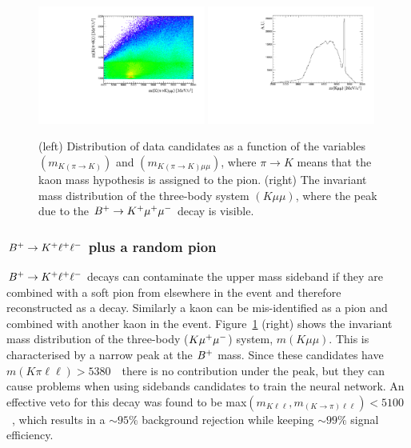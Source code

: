 \begin{center}
\begin{figure}[h!]
\centering 
\includegraphics[width=0.49\textwidth]{RKst/figs/Background/phi.pdf}
\includegraphics[width=0.49\textwidth]{RKst/figs/Background/Kmumu.pdf}
\caption{ (left) Distribution of data candidates as a function of the variables $(m_{K(\pi\rightarrow K)})$ 
and $(m_{K(\pi\rightarrow K)\mu\mu})$, where $\pi\rightarrow K$ means that the kaon mass hypothesis 
is assigned to the pion. (right) The invariant mass distribution of the three-body system $(K\mu\mu)$,
where the peak due to the $B^+ \rightarrow K^+ {\mu^+\mu^-}$ decay is visible. }
\label{fig:phiplots}
\end{figure}
\end{center}


\subsubsection{${{B}^+} \rightarrow K^+ \ell^+ \ell^-$ plus a random pion}

${{B}^+} \rightarrow K^+ \ell^+ \ell^-$ decays can contaminate the upper \Bz mass sideband if they are combined
with a soft pion from elsewhere in the event and therefore reconstructed as a \Bz decay.
Similarly a kaon can be mis-identified as a pion and combined with another kaon in the event.
Figure~\ref{fig:phiplots} (right) shows the invariant mass distribution of the three-body ($K{\mu^+\mu^-}$) system,
$m(K\mu\mu)$. This is characterised by a narrow peak at the ${{B}^+}$ mass. Since these
candidates have $m(K\pi\ell\ell) > 5380$~\mevcc~there is no contribution under the \Bz peak,
but they can cause problems when using sidebands candidates to train the neural network.
An effective veto for this decay was found to be max$(m_{K\ell\ell},m_{(K\to\pi)\ell\ell}) < 5100$~\mevcc,
which results in a $\sim95\%$ background rejection while keeping $\sim99\%$ signal efficiency.

